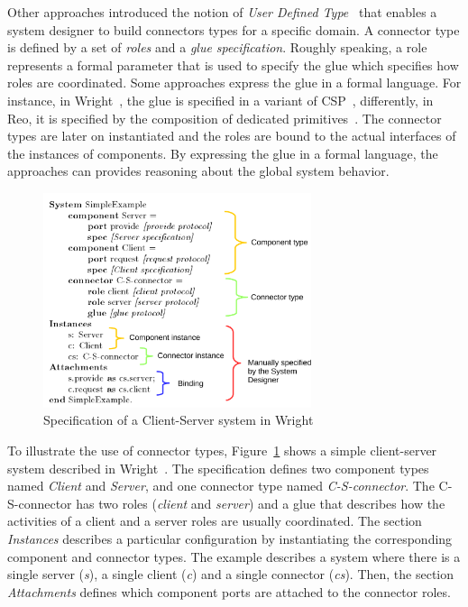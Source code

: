 Other approaches introduced the notion of \emph{User Defined Type}~\cite{uniconbib,wrightbib,reobib} that enables a system designer to build connectors types for a specific domain. A connector type is defined by a set of \emph{roles} and a \emph{glue specification}. Roughly speaking, a role represents a formal parameter that is used to specify the glue which specifies how roles are coordinated. Some approaches express the glue in a formal language. For instance, in Wright~\cite{wrightbib}, the glue is specified in a variant of CSP~\cite{csphoarebib}, differently, in Reo, it is specified by the composition of dedicated primitives~\cite{reobib}. The connector types are later on instantiated and the roles are bound to the actual interfaces of the instances of components. By expressing the glue in a formal language, the approaches can provides reasoning about the global system behavior. 

\begin{figure}
	\begin{center}
		\includegraphics[width=0.7\textwidth]{background/figs/wrightspec}
		\caption{Specification of a Client-Server system in Wright~\cite{wrightbib}}
		\label{fig:wrightspec}
	\end{center}
\end{figure}

To illustrate the use of connector types, Figure~\ref{fig:wrightspec} shows a simple client-server system described in Wright~\cite{wrightbib}. The specification defines two component types named \emph{Client} and \emph{Server}, and one connector type named \emph{C-S-connector}. The C-S-connector has two roles (\emph{client} and \emph{server}) and a glue that describes how the activities of a client and a server roles are usually coordinated. The section \emph{Instances} describes a particular configuration by instantiating the corresponding component and connector types. The example describes a system where there is a single server (\emph{s}), a single client (\emph{c}) and a single connector (\emph{cs}). Then, the section \emph{Attachments} defines which component ports are attached to the connector roles.

